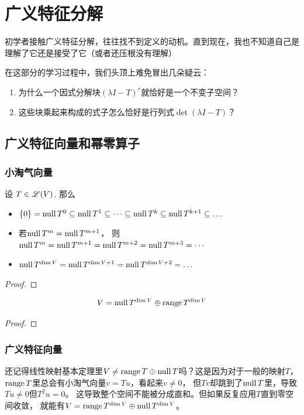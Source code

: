 \chapter{广义特征分解}

初学者接触广义特征分解，往往找不到定义的动机。直到现在，我也不知道自己是理解了它还是接受了它（或者还压根没有理解）

在这部分的学习过程中，我们头顶上难免冒出几朵疑云：
\begin{enumerate}
    \item 为什么一个因式分解块\((\lambda I - T)^{r} \)就恰好是一个不变子空间？
    \item 这些块乘起来构成的式子怎么恰好是行列式\(\det (\lambda I - T)\)？
\end{enumerate}
\section{广义特征向量和幂零算子}

\subsection{小淘气向量}
\begin{theorem}
    设 \(T \in \mathscr{L}(V)\). 那么
    \begin{itemize}
        \item \(\{0\} = \operatorname{null} T^0 \subseteq \operatorname{null} T^1 \subseteq \dots \subseteq \operatorname{null} T^k \subseteq \operatorname{null} T^{k+1} \subseteq \dots\)
        \item 若\(\operatorname{null} T^m = \operatorname{null} T^{m+1}\)，
            则\(\operatorname{null} T^m = \operatorname{null} T^{m+1} = \operatorname{null} T^{m+2} = \operatorname{null} T^{m+3} = \cdots\)
        \item \(\operatorname{null} T ^ {\dim V} = \operatorname{null} T ^ {\dim V + 1} = \operatorname{null} T ^ {\dim V + 2} = \dots\)
    \end{itemize}
\end{theorem}
\begin{proof}

\end{proof}
\begin{theorem}[Fitting引理]
    \[
        V = \operatorname{null} T^{\dim V}\oplus\operatorname{range} T^{\dim V}
    \]
\end{theorem}
\begin{proof}

\end{proof}
\subsection{广义特征向量}
还记得线性映射基本定理里\(V\neq \operatorname{range} T \oplus \operatorname{null} T\)吗？这是因为对于一般的映射\(T\)，
\(\operatorname{range} T\)里总会有小淘气向量\(v=Tu\)，看起来\(v\neq 0\)，
但\(Tv\)却跳到了\(\operatorname{null} T\)里，导致\(Tu\neq 0\)但\(T^{2}u=0\)。
这导致整个空间不能被分成直和。但如果反复应用\(T\)直到零空间收敛，
就能有\(V=\operatorname{range} T^{\dim V}\oplus \operatorname{null} T^{\dim V}\)。

